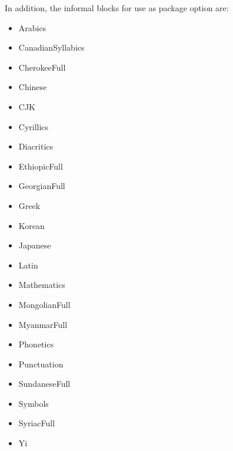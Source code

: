 \documentclass{article}
\newenvironment{itemlist}{%
  \begin{itemize}
  \setlength{\itemsep}{0pt}
  \setlength{\parsep}{0pt}
  \setlength{\topsep}{0pt}
  \setlength{\partopsep}{0pt}
  \setlength{\parskip}{0pt}
  \setlength{\labelsep}{5pt}}%
{
  \end{itemize}}
\begin{document}
    In addition, the informal blocks for use as package option are:

    \begin{multicols*}{2}
      \begin{itemlist}
        \item Arabics
        \item CanadianSyllabics
        \item CherokeeFull
        \item Chinese
        \item CJK
        \item Cyrillics
        \item Diacritics
        \item EthiopicFull
        \item GeorgianFull
        \item Greek
        \item Korean
        \item Japanese
        \item Latin
        \item Mathematics
        \item MongolianFull
        \item MyanmarFull
        \item Phonetics
        \item Punctuation
        \item SundaneseFull
        \item Symbols
        \item SyriacFull
        \item Yi
      \end{itemlist}
    \end{multicols*}
\end{document}
